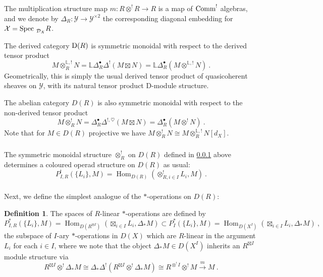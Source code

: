 \documentclass[11pt]{amsart}
\numberwithin{equation}{section}
\theoremstyle{definition}
\newtheorem{defn}[theo]{Definition}
\newcommand{\bb}{\mathbb}
\newcommand{\mc}{\mathcal}
\DeclareMathOperator{\Hom}{Hom}
\newcommand{\Spec}{{\textup{Spec\ }}}
\newcommand{\Comm}{{\textup{Comm}}}
\newcommand{\0}{{\textbf{0}}}
\newcommand{\Dd}{{\textup{D}}}
\newcommand{\DD}{{D}}
\begin{document}
\subsubsection{}\label{Rshotimessec} The multiplication structure map $m:R\otimes^!R\to R$ is a map of $\Comm^!$ algebras, and we denote by $\Delta_R:\mc Y \to \mc Y^{\times 2}$ the corresponding diagonal embedding for $\mc X=\Spec_{\mc D_X}R$.


The derived category $\Dd(R)$ is symmetric monoidal with respect to the derived tensor product
\[ M\otimes_R^{\bb L,!} N= \bb L\Delta_R^\bullet  \Delta^!(M\boxtimes N)  =  \bb L\Delta_R^\bullet (M\otimes^{\bb L,!}N) \ . \]
Geometrically, this is simply the usual derived tensor product of quasicoherent sheaves on $\mc Y$, with its natural tensor product D-module structure.

The abelian category $\DD(R)$ is also symmetric monoidal with respect to the non-derived tensor product
\[ M\otimes^!_R N =  \Delta_R^\bullet \Delta^{!,\heartsuit}(M\boxtimes N) = \Delta_R^\bullet( M\otimes^! N)  \ . \]
Note that for $M\in \DD(R)$ projective we have $M\otimes^!_R N\cong M\otimes_R^{\bb L,!} N[d_X]$.



\subsubsection{}

The symmetric monoidal structure $\otimes_R^{!}$ on $\DD(R)$ defined in \ref{Rshotimessec} above determines a coloured operad structure on $\DD(R)$ as usual:
\[ P^!_{I,R}(\{L_i\},M) = \Hom_{\DD(R)}( \otimes_{R,i\in I}^{!} L_i, M)  \ . \]



\subsubsection{} Next, we define the simplest analogue of the $*$-operations on $\DD(R)$:

\begin{defn}\label{Rlindefn}  The spaces of $R$-linear $*$-operations are defined by
\[ P_{I,R}^*(\{L_i\},M)=\Hom_{\DD(R^{\boxtimes I})}(\boxtimes_{i\in I} L_i, \Delta_*M)   \subset  P_{I}^*(\{L_i\},M)=\Hom_{\DD(X^I)}( \boxtimes_{i\in I} L_i,\Delta_* M)  \ , \]
the subspace of $I$-ary $*$-operations in $\DD(X)$ which are $R$-linear in the argument $L_i$ for each $i\in I$, where we note that the object $\Delta_*M \in \DD(X^I)$ inherits an $R^{\boxtimes I}$ module structure via\[ R^{\boxtimes I} \otimes^! \Delta_* M \cong \Delta_* \Delta^!(R^{\boxtimes I} \otimes^! \Delta_* M) \cong R^{\otimes^! I} \otimes^! M \xrightarrow{m} M \ . \]

\end{defn}
\end{document}
